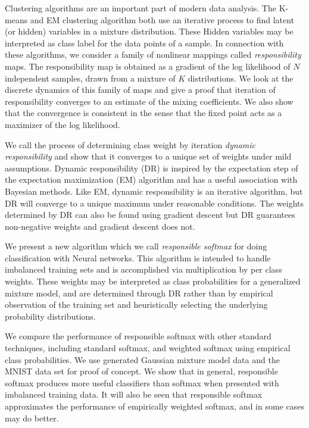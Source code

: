 

Clustering algorithms are an important part of modern data analysis.  The K-means and EM clustering algorithm both use an iterative process to find latent (or hidden) variables in a mixture distribution.  These Hidden variables may be interpreted as class label for the data points of a sample.  In connection with these algorithms, we consider a family of nonlinear mappings called \textit{responsibility} maps. The responsibility map is obtained as a gradient of the log likelihood of $N$ independent samples, drawn from a mixture of $K$ distributions.  We look at the discrete dynamics of this family of maps and give a proof that iteration of responsibility converges to an estimate of the mixing coefficients.  We also show that the convergence is consistent in the sense that the fixed point acts as a maximizer of the log likelihood.

We call the process of determining class weight by iteration \textit{dynamic responsibility} and show that it converges to a unique set of weights under mild assumptions. Dynamic responsibility (DR) is inspired by the expectation step of the expectation maximization (EM) algorithm and has a useful association with Bayesian methods.  Like EM, dynamic responsibility is an iterative algorithm, but DR will converge to a unique maximum under reasonable conditions.  The weights determined by DR can also be found using gradient descent but DR guarantees non-negative weights and gradient descent does not.

We present a new algorithm which we call \textit{responsible softmax} for doing classification with Neural networks.  This algorithm is intended to handle imbalanced training sets and is accomplished via multiplication by per class weights.  These weights may be interpreted as class probabilities for a generalized mixture model, and are determined through DR rather than by empirical observation of the training set and heuristically selecting the underlying probability distributions.

We compare the performance of responsible softmax with other standard techniques, including standard softmax, and weighted softmax using empirical class probabilities.  We use generated Gaussian mixture model data and the MNIST data set for proof of concept.  We show that in general, responsible softmax produces more useful classifiers than softmax when presented with imbalanced training data.  It will also be seen that responsible softmax approximates the performance of empirically weighted softmax, and in some cases may do better.